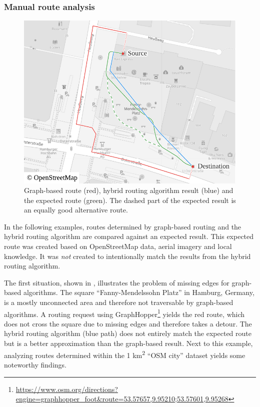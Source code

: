 		\subsubsection{Manual route analysis}
		\label{subsubsec:manual-route-analysis}
		
			\begin{figure}
				\vspace{-2.5\baselineskip}
				\begin{figcenter}
					\includegraphics[width=\linewidth]{images/qgis-routing-osterstrasse}
				\end{figcenter}
				\caption[Comparison of normal routing with hybrid visibility routing.]{Graph-based route (red), hybrid routing algorithm result (blue) and the expected route (green). The dashed part of the expected result is an equally good alternative route.}
				\label{fig:eval-osterstrasse}
			\end{figure}
		
			In the following examples, routes determined by graph-based routing and the hybrid routing algorithm are compared against an expected result.
			This expected route was created based on OpenStreetMap data, aerial imagery and local knowledge.
			It was \emph{not} created to intentionally match the results from the hybrid routing algorithm.
		
			The first situation, shown in , illustrates the problem of missing edges for graph-based algorithms.
			The square \enquote{Fanny-Mendelssohn Platz} in Hamburg, Germany, is a mostly unconnected area and therefore not traversable by graph-based algorithms.
			A routing request using GraphHopper\footnote{\url{https://www.osm.org/directions?engine=graphhopper\_foot\&route=53.57657,9.95210;53.57601,9.95268}} yields the red route, which does not cross the square due to missing edges and therefore takes a detour.
			The hybrid routing algorithm (blue path) does not entirely match the expected route but is a better approximation than the graph-based result.
			Next to this example, analyzing routes determined within the 1 km\textsuperscript{2} \enquote{OSM city} dataset yields some noteworthy findings.
			
